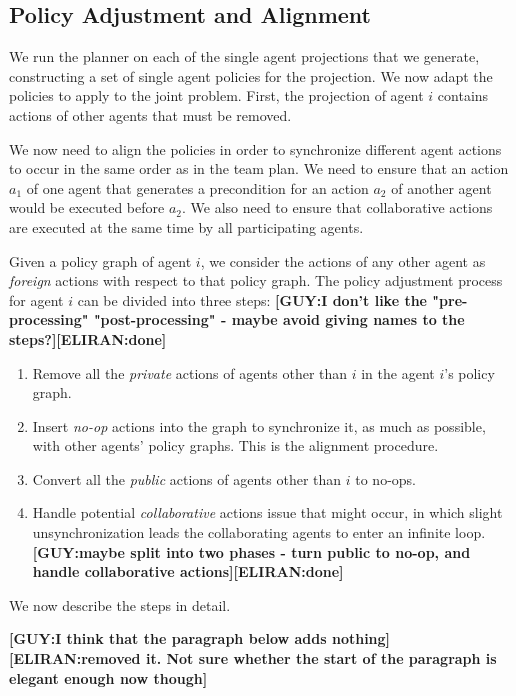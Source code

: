 \documentclass[letterpaper]{article} %
\newcommand{\eliran}[1]{\textbf{[\color{red}ELIRAN:#1]}}
\newcommand{\guy}[1]{\textbf{[\color{orange}GUY:#1]}}
\begin{document}
\subsection{Policy Adjustment and Alignment}

We run the planner on each of the single agent projections that we generate, constructing a set of single agent policies for the projection. We now adapt the policies to apply to the joint problem. First, the projection of agent $i$ contains actions of other agents that must be removed.

We now need to align the policies in order to synchronize different agent actions to occur in the same order as in the team plan. We need to ensure that an action $a_1$ of one agent that generates a precondition for an action $a_2$ of another agent would be executed before $a_2$. We also need to ensure that collaborative actions are executed at the same time by all participating agents. 

Given a policy graph of agent $i$, we consider the actions of any other agent as \emph{foreign} actions with respect to that policy graph. The policy adjustment process for agent $i$ can be divided into three steps:
\guy{I don't like the "pre-processing" "post-processing" - maybe avoid giving names to the steps?}\eliran{done}
\begin{enumerate}
    \item Remove all the \emph{private} actions of agents other than $i$ in the agent $i$'s policy graph.
    \item Insert \emph{no-op} actions into the graph to synchronize it, as much as possible, with other agents' policy graphs. This is the alignment procedure.
    \item Convert all the \emph{public} actions of  agents other than $i$ to no-ops.
    \item Handle potential \emph{collaborative} actions issue that might occur, in which slight unsynchronization leads the collaborating agents to enter an infinite loop. \guy{maybe split into two phases - turn public to no-op, and handle collaborative actions}\eliran{done}
\end{enumerate}
We now describe the steps in detail.

\guy{I think that the paragraph below adds nothing}\eliran{removed it. Not sure whether the start of the paragraph is elegant enough now though}
\end{document}
